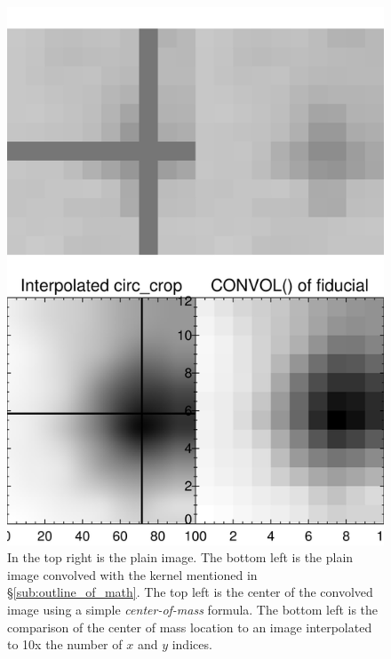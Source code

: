 \documentclass[10pt]{article}
\begin{document}
\begin{figure}[ht]
        \begin{minipage}{.45\textwidth}
            \centering
                \includegraphics[width=\linewidth]{../plots_tables_images/cropcomp0.png}
                \caption{In the top right is the plain image. The bottom left is the plain image convolved with the kernel mentioned in \S \ref{sub:outline_of_math}. The top left is the center of the convolved image using a simple \emph{center-of-mass} formula. The bottom left is the comparison of the center of mass location to an image interpolated to 10x the number of $x$ and $y$ indices.}
        \end{minipage}
        \hspace{.5in}
        \begin{minipage}{.45\textwidth}
        \vspace{-.65in}

\end{minipage}
\end{figure}
\end{document}
